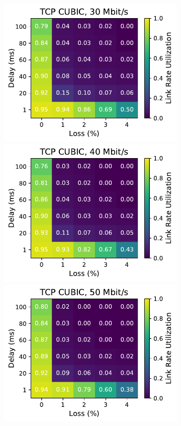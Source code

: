 \begin{figure}[ht]
\begin{subfigure}[b]{0.22\linewidth}
        \includegraphics[width=\linewidth,trim={0 0 2cm 0},clip]{figures/heatmaps/heatmap_tcp_cubic_30mbps.pdf}
        \includegraphics[width=\linewidth,trim={0 0 2cm 0},clip]{figures/heatmaps/heatmap_tcp_cubic_40mbps.pdf}
        \includegraphics[width=\linewidth,trim={0 0 2cm 0},clip]{figures/heatmaps/heatmap_tcp_cubic_50mbps.pdf}

\end{subfigure}
\end{figure}
